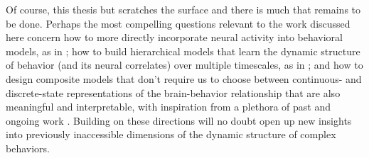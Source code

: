 Of course, this thesis but scratches the surface and there is much that remains to be done. Perhaps the most compelling questions relevant to the work discussed here concern how to more directly incorporate neural activity into behavioral models, as in \cite{schneider_learnable_2023}; how to build hierarchical models that learn the dynamic structure of behavior (and its neural correlates) over multiple timescales, as in \cite{tao_statistical_2019}; and how to design composite models that don't require us to choose between continuous- and discrete-state representations of the brain-behavior relationship that are also meaningful and interpretable, with inspiration from a plethora of past and ongoing work \cite{escola_hidden_2011, wiltschko_mapping_2015, johnson_composing_2016, linderman_hierarchical_2019, calhoun_unsupervised_2019, roy_extracting_2021, costacurta_distinguishing_2022, ashwood_mice_2022, bolkan_opponent_2022, weinreb_keypoint-moseq_2023}. Building on these directions will no doubt open up new insights into previously inaccessible dimensions of the dynamic structure of complex behaviors. 
